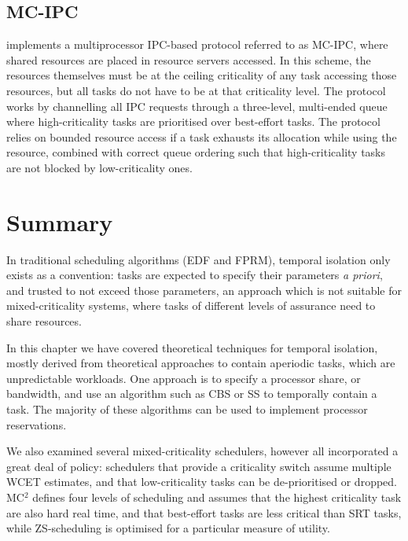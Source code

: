 \subsection{MC-IPC}
\label{sec:sched-mc-ipc}

\citet{Brandenburg_14} implements a multiprocessor \gls{IPC}-based protocol referred to as MC-IPC,
where shared resources are placed in resource servers accessed. In this scheme, the resources
themselves must be at the ceiling criticality of any task accessing those resources,
but all tasks do not have to be at that criticality level.
The protocol works by channelling all IPC requests through a three-level, multi-ended queue
where high-criticality tasks are prioritised over best-effort tasks. The protocol relies on bounded
resource access if a task exhausts its allocation while using the resource, combined with correct
queue ordering such that high-criticality tasks are not blocked by low-criticality ones. 

\section{Summary}

In traditional scheduling algorithms (\gls{EDF} and \gls{FPRM}), temporal isolation only exists as a
convention: tasks are expected to specify their parameters \emph{a priori}, and trusted to not
exceed those parameters, an approach which is not suitable for mixed-criticality systems, where
tasks of different levels of assurance need to share resources.

In this chapter we have covered theoretical techniques for temporal isolation, mostly derived from 
theoretical approaches to contain aperiodic tasks, which are unpredictable workloads. One approach
is to specify a processor share, or bandwidth, and use an algorithm such as \gls{CBS} or \gls{SS} to 
temporally contain a task. The majority of these algorithms can be used to implement processor
reservations.

We also examined several mixed-criticality schedulers, however all incorporated a great deal of
policy: schedulers that provide a criticality switch assume multiple \gls{WCET} estimates, and
that low-criticality tasks can be de-prioritised or dropped. MC$^2$ defines four levels of
scheduling and assumes that the highest criticality task are also hard real time, and that
best-effort tasks are less critical than \gls{SRT} tasks, while \gls{ZS}-scheduling is optimised for
a particular measure of utility. 

